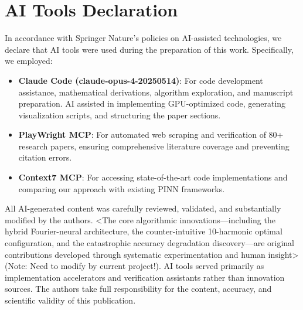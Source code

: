 \section*{AI Tools Declaration}

In accordance with Springer Nature's policies on AI-assisted technologies, we declare that AI tools were used during the preparation of this work. Specifically, we employed:

\begin{itemize}
\item \textbf{Claude Code (claude-opus-4-20250514)}: For code development assistance, mathematical derivations, algorithm exploration, and manuscript preparation. AI assisted in implementing GPU-optimized code, generating visualization scripts, and structuring the paper sections.
\item \textbf{PlayWright MCP}: For automated web scraping and verification of 80+ research papers, ensuring comprehensive literature coverage and preventing citation errors.
\item \textbf{Context7 MCP}: For accessing state-of-the-art code implementations and comparing our approach with existing PINN frameworks.
\end{itemize}

All AI-generated content was carefully reviewed, validated, and substantially modified by the authors. <The core algorithmic innovations—including the hybrid Fourier-neural architecture, the counter-intuitive 10-harmonic optimal configuration, and the catastrophic accuracy degradation discovery—are original contributions developed through systematic experimentation and human insight>(Note: Need to modify by current project!).  AI tools served primarily as implementation accelerators and verification assistants rather than innovation sources. The authors take full responsibility for the content, accuracy, and scientific validity of this publication.

